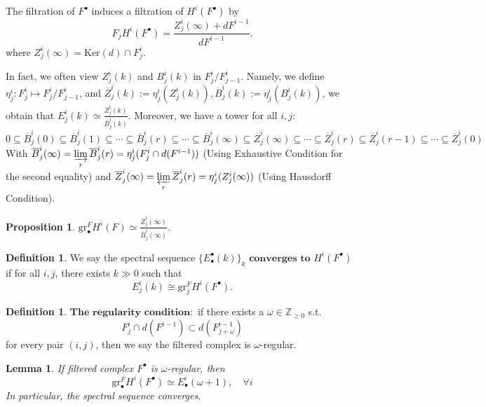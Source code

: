 \documentclass[openany]{book}
\newtheorem{lemma}[theorem]{Lemma}     %
\newtheorem{proposition}[theorem]{Proposition} %
\theoremstyle{definition} %
\newtheorem{definition}[theorem]{Definition} %
\theoremstyle{remark}
\begin{document}
\quad

The filtration of $F^{\bullet}$ induces a filtration of $H^i(F^{\bullet})$ by $$F_j H^i(F^\bullet) = \frac{Z_j^{i}(\infty) + dF^{i-1}}{dF^{i-1}}.$$where $Z_j^{i}(\infty) = \text{Ker}(d) \cap F_j^i$.

In fact, we often view $Z^{i}_{j}(k)$ and $B^{i}_{j}(k)$ in $F^{i}_{j} /F^{i}_{j-1}$. Namely, we define $\eta^{i}_{j}:F^{i}_{j}\mapsto F^{i}_{j} /F^{i}_{j-1}$, and $\overline{Z}^{i}_{j}(k):=\eta^{i}_{j}(Z^{i}_{j}(k)),\overline{B}^{i}_{j}(k):=\eta^{i}_{j}(B^{i}_{j}(k))$, we obtain that $E^{i}_{j}(k)\simeq \frac{\overline{Z}^{i}_{j}(k)}{\overline{B}^{i}_{j}(k)}$. Moreover, we have a tower for all $i,j:$ $$
    0 \subseteq \overline{B}_j^i(0) \subseteq \overline{B}_j^i(1) \subseteq \cdots \subseteq \overline{B}_j^i(r) \subseteq \cdots \subseteq \overline{B}_j^i(\infty)
    \subseteq \overline{Z}_j^i(\infty) \subseteq \cdots \subseteq \overline{Z}_j^i(r) \subseteq \overline{Z}_j^i(r-1) \subseteq \cdots \subseteq \overline{Z}_j^i(0)
$$With $\overline{B}_j^i(\infty) =\varinjlim\limits_{r} \overline{B}_j^i(r) = \eta_j^i(F_j^i \cap d(F^{i-1}))$ (Using Exhaustive Condition for the second equality) and $\overline{Z}_j^i(\infty) = \varprojlim\limits_{ r} \overline{Z}_j^i(r) = \eta_j^i(Z_j^i(\infty))$ (Using Hausdorff Condition).

\begin{proposition}
    $\mathrm{gr}_{\bullet}^{F}H^{i}(F)\simeq \frac{\overline{Z}^{i}_{j}(\infty)}{\overline{B}^{i}_{j}(\infty)}$.
\end{proposition}

\quad

\begin{definition}
    We say the spectral sequence $\{E_{\bullet}^{\bullet}(k)\}_k$ $\textbf{converges to}$ $H^i(F^{\bullet})$ if for all $i,j$, there exists $k \gg 0$ such that $$E_j^i(k) \cong \text{gr}_j^F H^i(F^{\bullet}).$$
\end{definition}

\begin{definition}$\textbf{The regularity condition}:$
    if there exists a $\omega \in \mathbb{Z}_{\ge0}$ s.t.$$F_j^i \cap d(F^{i-1}_{}) \subset d(F_{j+\omega}^{i-1})$$for every pair $(i,j)$, then we say the filtered complex is $\omega$-regular.
\end{definition}

\begin{lemma}\label{lemma 7.8}
    If filtered complex $F^{\bullet}$ is $\omega$-regular, then $$\mathrm{gr}^F_{\bullet} H^{i}(F^\bullet) \simeq E_{\bullet}^{i}(\omega+1), \quad \forall i$$In particular, the spectral sequence converges.
\end{lemma}
\end{document}
